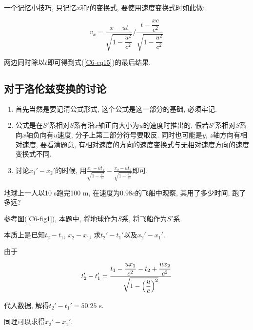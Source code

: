 \begin{note}
	一个记忆小技巧, 只记忆$x$和$t$的变换式, 要使用速度变换式时如此做: 
	
	\begin{equation*}
		v_x = \dfrac{x - ut}{\sqrt{1 - \dfrac{u^2}{c^2}}} / \dfrac{t - \dfrac{x c}{c^2}}{\sqrt{1 - \dfrac{u^2}{c^2}}}
	\end{equation*}
	
	两边同时除以$t$即可得到式(\ref{C6-eq15})的最后结果. 
	
\end{note}

\subsection{对于洛伦兹变换的讨论}

\begin{enumerate}
	
	\item 首先当然是要记清公式形式, 这个公式是这一部分的基础, 必须牢记. 
	
	\item 公式是在$S'$系相对$S$系有沿$x$轴正向大小为$u$的速度时推出的, 假若$S'$系相对$S$系向$x$轴负向有$u$速度, 分子上第二部分符号要取反. 同时也可能是$y$, $z$轴方向有相对速度, 要看清题意, 有相对速度的方向的速度变换式与无相对速度方向的速度变换式不同. 
	
	\item 讨论$x_1' - x_2'$的时候, 用$\frac{x_1 - ut_1}{\sqrt{1 - \frac{u^2}{c^2}}} - \frac{x_2 - ut_2}{\sqrt{1 - \frac{u^2}{c^2}}}$即可. 
	
\end{enumerate}

\vskip 0.4cm

\begin{example}
	地球上一人以10 s跑完100 m, 在速度为$0.98 c$的飞船中观察, 其用了多少时间, 跑了多远? 
	
	\begin{solution}
		
		参考图(\ref{C6-fig1}), 本题中, 将地球作为$S$系, 将飞船作为$S'$系. 
		
		本质上是已知$t_2 - t_1$, $x_2 - x_1$, 求$t_2' - t_1'$以及$x_2' - x_1'$.
		
		由于
		
		\begin{equation*}
			t_2' - t_1' = \dfrac{t_1 - \dfrac{u x_1}{c^2} - t_2 + \dfrac{u x_2}{c^2}}{\sqrt{1 - \qty(\dfrac{u}{c})^2}}
		\end{equation*}
		
		代入数据, 解得$t_2' - t_1' = 50.25$ s.
		
		同理可以求得$x_2' - x_1'$. 
		
	\end{solution}
	
\end{example}

